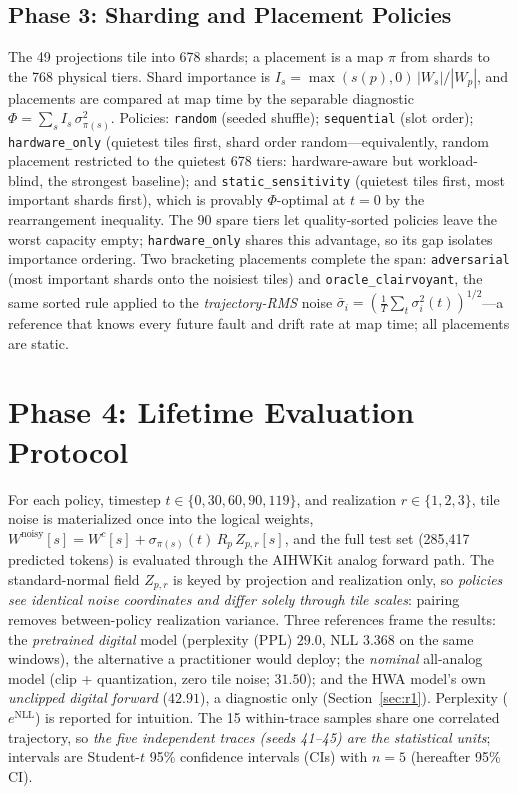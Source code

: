 \documentclass[journal]{IEEEtran}
\newcommand{\policy}[1]{\texttt{#1}}
\begin{document}
\subsection{Phase 3: Sharding and Placement Policies}
The 49 projections tile into 678 shards; a placement is a map $\pi$
from shards to the 768 physical tiers. Shard importance is
$I_s = \max(s(p), 0)\,|W_s|/|W_p|$, and placements are compared at map
time by the separable diagnostic
$\Phi = \sum_s I_s\,\sigma^2_{\pi(s)}$.
Policies: \policy{random} (seeded shuffle); \policy{sequential} (slot
order); \policy{hardware\_only} (quietest tiles first, shard order
random---equivalently, random placement restricted to the quietest 678
tiers: hardware-aware but workload-blind, the strongest baseline);
and \policy{static\_sensitivity} (quietest tiles first, most important
shards first), which is provably $\Phi$-optimal at $t{=}0$ by the
rearrangement inequality. The 90 spare tiers let quality-sorted
policies leave the worst capacity empty; \policy{hardware\_only} shares
this advantage, so its gap isolates importance ordering. Two
bracketing placements complete the span:
\policy{adversarial} (most important shards onto the noisiest tiles) and
\policy{oracle\_clairvoyant}, the same sorted rule applied to the
\emph{trajectory-RMS} noise
$\bar{\sigma}_i = (\tfrac{1}{T}\sum_t \sigma_i^2(t))^{1/2}$---a
reference that knows every future fault and drift rate at map time; all
placements are static.

\section{Phase 4: Lifetime Evaluation Protocol}
\label{sec:protocol}

For each policy, timestep $t \in \{0, 30, 60, 90, 119\}$, and
realization $r \in \{1,2,3\}$, tile noise is materialized once into the
logical weights, $W^{\mathrm{noisy}}[s] = W^{c}[s] + \sigma_{\pi(s)}(t)\,
R_p\, Z_{p,r}[s]$, and the full test set (285{,}417 predicted tokens)
is evaluated through
the AIHWKit analog forward path. The standard-normal field $Z_{p,r}$ is
keyed by projection and realization only, so \emph{policies see
identical noise coordinates and differ solely through tile scales}:
pairing removes between-policy realization variance. Three references
frame the results: the
\emph{pretrained digital} model (perplexity (PPL) $29.0$, NLL $3.368$ on
the same windows), the alternative a practitioner would deploy; the \emph{nominal} all-analog
model (clip + quantization, zero tile noise; $31.50$); and the HWA
model's own \emph{unclipped digital forward} ($42.91$), a diagnostic
only (Section~\ref{sec:r1}). Perplexity ($e^{\mathrm{NLL}}$) is
reported for intuition.
The 15 within-trace samples share one correlated trajectory, so
\emph{the five independent traces (seeds 41--45) are the statistical
units}; intervals are Student-$t$ 95\% confidence intervals (CIs) with
$n{=}5$ (hereafter 95\% CI).
\end{document}
